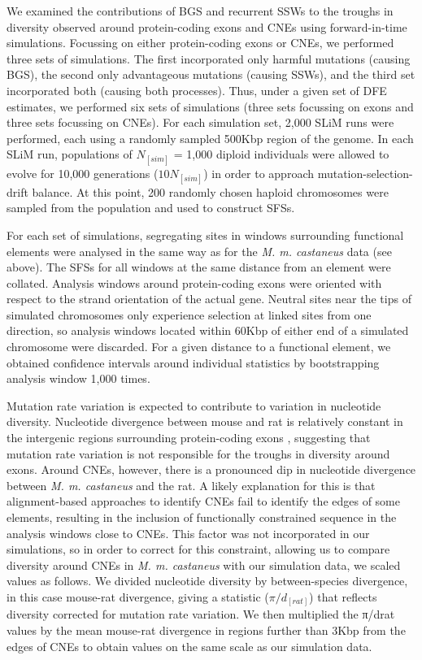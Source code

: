 We examined the contributions of BGS and recurrent SSWs to the troughs in diversity observed around protein-coding exons and CNEs using forward-in-time simulations. Focussing on either protein-coding exons or CNEs, we performed three sets of simulations. The first incorporated only harmful mutations (causing BGS), the second only advantageous mutations (causing SSWs), and the third set incorporated both (causing both processes). Thus, under a given set of DFE estimates, we performed six sets of simulations (three sets focussing on exons and three sets focussing on CNEs). For each simulation set, 2,000 SLiM runs were performed, each using a randomly sampled 500Kbp region of the genome. In each SLiM run, populations of $N_[sim]$ = 1,000 diploid individuals were allowed to evolve for 10,000 generations ($10N_[sim]$) in order to approach mutation-selection-drift balance. At this point, 200 randomly chosen haploid chromosomes were sampled from the population and used to construct SFSs.
 
For each set of simulations, segregating sites in windows surrounding functional elements were analysed in the same way as for the \textit{M. m. castaneus} data (see above). The SFSs for all windows at the same distance from an element were collated. Analysis windows around protein-coding exons were oriented with respect to the strand orientation of the actual gene. Neutral sites near the tips of simulated chromosomes only experience selection at linked sites from one direction, so analysis windows located within 60Kbp of either end of a simulated chromosome were discarded. For a given distance to a functional element, we obtained confidence intervals around individual statistics by bootstrapping analysis window 1,000 times.

Mutation rate variation is expected to contribute to variation in nucleotide diversity. Nucleotide divergence between mouse and rat is relatively constant in the intergenic regions surrounding protein-coding exons \citep{RN122}, suggesting that mutation rate variation is not responsible for the troughs in diversity around exons. Around CNEs, however, there is a pronounced dip in nucleotide divergence between \textit{M. m. castaneus} and the rat. A likely explanation for this is that alignment-based approaches to identify CNEs fail to identify the edges of some elements, resulting in the inclusion of functionally constrained sequence in the analysis windows close to CNEs. This factor was not incorporated in our simulations, so in order to correct for this constraint, allowing us to compare diversity around CNEs in \textit{M. m. castaneus} with our simulation data, we scaled values as follows. We divided nucleotide diversity by between-species divergence, in this case mouse-rat divergence, giving a statistic ($\pi/d_[rat]$) that reflects diversity corrected for mutation rate variation. We then multiplied the π/drat values by the mean mouse-rat divergence in regions further than 3Kbp from the edges of CNEs to obtain values on the same scale as our simulation data.

